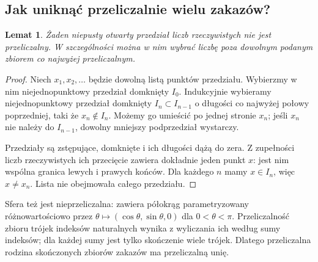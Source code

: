 \documentclass[11pt,a4paper]{article}
\numberwithin{equation}{section}
\theoremstyle{plain}
\newtheorem{lemat}[twierdzenie]{Lemat}
\theoremstyle{definition}
\theoremstyle{remark}
\begin{document}
\subsection{Jak uniknąć przeliczalnie wielu zakazów?}
\begin{lemat}\label{lem:nieprzeliczalnosc}
Żaden niepusty otwarty przedział liczb rzeczywistych nie jest przeliczalny. W szczególności można w nim wybrać liczbę poza dowolnym podanym zbiorem co najwyżej przeliczalnym.
\end{lemat}
\begin{proof}
Niech $x_1,x_2,\ldots$ będzie dowolną listą punktów przedziału. Wybierzmy w nim niejednopunktowy przedział domknięty $I_0$. Indukcyjnie wybieramy niejednopunktowy przedział domknięty $I_n\subset I_{n-1}$ o długości co najwyżej połowy poprzedniej, taki że $x_n\notin I_n$. Możemy go umieścić po jednej stronie $x_n$; jeśli $x_n$ nie należy do $I_{n-1}$, dowolny mniejszy podprzedział wystarczy.

Przedziały są zstępujące, domknięte i ich długości dążą do zera. Z zupełności liczb rzeczywistych ich przecięcie zawiera dokładnie jeden punkt $x$: jest nim wspólna granica lewych i prawych końców. Dla każdego $n$ mamy $x\in I_n$, więc $x\ne x_n$. Lista nie obejmowała całego przedziału.
\end{proof}
Sfera też jest nieprzeliczalna: zawiera półokrąg parametryzowany różnowartościowo przez $\theta\mapsto(\cos\theta,\sin\theta,0)$ dla $0<\theta<\pi$. Przeliczalność zbioru trójek indeksów naturalnych wynika z wyliczania ich według sumy indeksów; dla każdej sumy jest tylko skończenie wiele trójek. Dlatego przeliczalna rodzina skończonych zbiorów zakazów ma przeliczalną unię.
\end{document}

